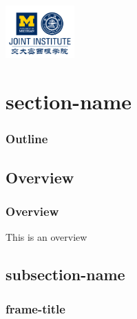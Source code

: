 \documentclass[11pt, t]{beamer}
\author{Author}
\begin{document}
\begin{frame}
    \titlepage
    \begin{center}
        \includegraphics[height=2cm]{Figures/logo/logo2.png}
    \end{center}
\end{frame}

\section{section-name}
\begin{frame}
    \frametitle{Outline}
    \begin{spacing}{1.2}
        \tableofcontents[currentsubsection,hideothersubsections,sectionstyle=hide]
    \end{spacing}
\end{frame}

\subsection{Overview}
\begin{frame}
    \frametitle{Overview}
    This is an overview
    \vspace{1cm}
\end{frame}

\subsection{subsection-name}
\begin{frame}[allowframebreaks]
    \frametitle{frame-title}

\end{frame}
\end{document}
